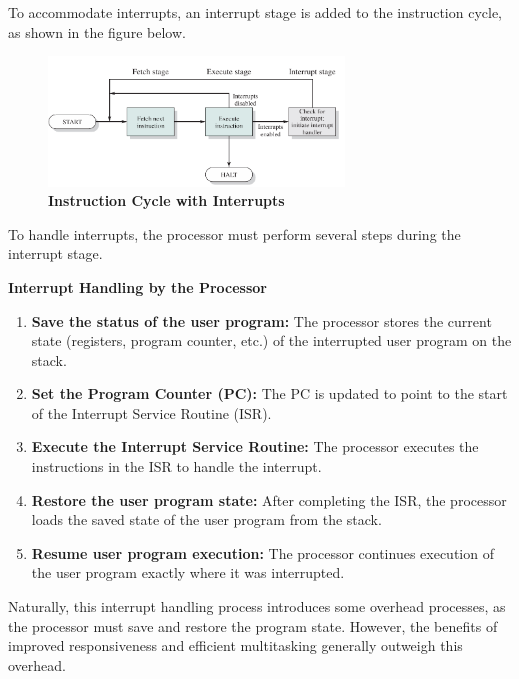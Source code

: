 \documentclass{article}
\begin{document}
To accommodate interrupts, an interrupt stage is added to the instruction cycle, as shown in the figure below.
\begin{figure}[!h]
    \centering
    \includegraphics[width=0.7\textwidth]{figures/Ch01Figure5.png} %
    \caption{\textbf{Instruction Cycle with Interrupts}}
    \label{fig:Ch01Fig5}
\end{figure}

To handle interrupts, the processor must perform several steps during the interrupt stage.
\begin{methodbox}
\textbf{Interrupt Handling by the Processor}

\begin{enumerate}
    \item \textbf{Save the status of the user program:} The processor stores the current state (registers, program counter, etc.) of the interrupted user program on the stack.
    \item \textbf{Set the Program Counter (PC):} The PC is updated to point to the start of the Interrupt Service Routine (ISR).
    \item \textbf{Execute the Interrupt Service Routine:} The processor executes the instructions in the ISR to handle the interrupt.
    \item \textbf{Restore the user program state:} After completing the ISR, the processor loads the saved state of the user program from the stack.
    \item \textbf{Resume user program execution:} The processor continues execution of the user program exactly where it was interrupted.
\end{enumerate}

\end{methodbox}

Naturally, this interrupt handling process introduces some overhead processes, as the processor must save and restore the program state.
However, the benefits of improved responsiveness and efficient multitasking generally outweigh this overhead.

\newpage
\end{document}
